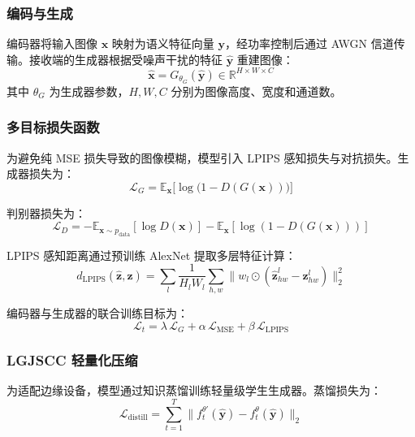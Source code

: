 \documentclass[lang=cn,a4paper,newtx,citestyle=gb7714-2015,bibstyle=gb7714-2015]{elegantpaper}
\begin{document}
\subsubsection{编码与生成}

编码器将输入图像 $\mathbf{x}$ 映射为语义特征向量 $\mathbf{y}$，经功率控制后通过 AWGN 信道传输。接收端的生成器根据受噪声干扰的特征 $\hat{\mathbf{y}}$ 重建图像：
\begin{equation}
  \hat{\mathbf{x}} = G_{\theta_G}(\hat{\mathbf{y}}) \in \mathbb{R}^{H \times W \times C}
\end{equation}
其中 $\theta_G$ 为生成器参数，$H, W, C$ 分别为图像高度、宽度和通道数。

\subsubsection{多目标损失函数}

为避免纯 MSE 损失导致的图像模糊，模型引入 LPIPS 感知损失与对抗损失。生成器损失为：
\begin{equation}
  \mathcal{L}_G = \mathbb{E}_{\mathbf{x}} \bigl[\log\bigl(1 - D(G(\mathbf{x}))\bigr)\bigr]
\end{equation}

判别器损失为：
\begin{equation}
  \mathcal{L}_D = -\mathbb{E}_{\mathbf{x} \sim p_{\text{data}}} [\log D(\mathbf{x})]
         - \mathbb{E}_{\mathbf{x}} [\log(1 - D(G(\mathbf{x})))]
\end{equation}

LPIPS 感知距离通过预训练 AlexNet 提取多层特征计算：
\begin{equation}
  d_{\text{LPIPS}}(\hat{\mathbf{z}}, \mathbf{z})
  = \sum_{l} \frac{1}{H_l W_l} \sum_{h,w}
    \bigl\| w_l \odot (\hat{\mathbf{z}}^l_{hw} - \mathbf{z}^l_{hw}) \bigr\|_2^2
\end{equation}

编码器与生成器的联合训练目标为：
\begin{equation}
  \mathcal{L}_t = \lambda\,\mathcal{L}_G + \alpha\,\mathcal{L}_{\text{MSE}} + \beta\,\mathcal{L}_{\text{LPIPS}}
\end{equation}

\subsubsection{LGJSCC 轻量化压缩}

为适配边缘设备，模型通过知识蒸馏训练轻量级学生生成器。蒸馏损失为：
\begin{equation}
  \mathcal{L}_{\text{distill}} = \sum_{t=1}^{T}
    \bigl\| f_t^{\theta'}(\hat{\mathbf{y}}) - f_t^{\theta}(\hat{\mathbf{y}}) \bigr\|_2
\end{equation}
\end{document}

